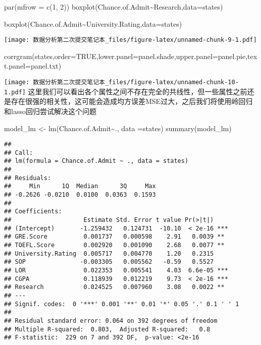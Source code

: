 \documentclass[
]{article}
\newenvironment{Shaded}{\begin{snugshade}}{\end{snugshade}}
\newcommand{\AttributeTok}[1]{\textcolor[rgb]{0.77,0.63,0.00}{#1}}
\newcommand{\ConstantTok}[1]{\textcolor[rgb]{0.00,0.00,0.00}{#1}}
\newcommand{\DecValTok}[1]{\textcolor[rgb]{0.00,0.00,0.81}{#1}}
\newcommand{\FunctionTok}[1]{\textcolor[rgb]{0.00,0.00,0.00}{#1}}
\newcommand{\NormalTok}[1]{#1}
\newcommand{\OtherTok}[1]{\textcolor[rgb]{0.56,0.35,0.01}{#1}}
\newcommand{\SpecialCharTok}[1]{\textcolor[rgb]{0.00,0.00,0.00}{#1}}
\begin{document}
\begin{Shaded}
\begin{Highlighting}[]
\FunctionTok{par}\NormalTok{(}\AttributeTok{mfrow =} \FunctionTok{c}\NormalTok{(}\DecValTok{1}\NormalTok{, }\DecValTok{2}\NormalTok{))}
\FunctionTok{boxplot}\NormalTok{(Chance.of.Admit}\SpecialCharTok{\textasciitilde{}}\NormalTok{Research,}\AttributeTok{data=}\NormalTok{states)}

\FunctionTok{boxplot}\NormalTok{(Chance.of.Admit}\SpecialCharTok{\textasciitilde{}}\NormalTok{University.Rating,}\AttributeTok{data=}\NormalTok{states)}
\end{Highlighting}
\end{Shaded}

\texttt{[image: 数据分析第二次提交笔记本\_files/figure-latex/unnamed-chunk-9-1.pdf]}

\begin{Shaded}
\begin{Highlighting}[]
\FunctionTok{corrgram}\NormalTok{(states,}\AttributeTok{order=}\ConstantTok{TRUE}\NormalTok{,}\AttributeTok{lower.panel=}\NormalTok{panel.shade,}\AttributeTok{upper.panel=}\NormalTok{panel.pie,}\AttributeTok{text.panel=}\NormalTok{panel.txt)}
\end{Highlighting}
\end{Shaded}

\texttt{[image: 数据分析第二次提交笔记本\_files/figure-latex/unnamed-chunk-10-1.pdf]}
这里我们可以看出各个属性之间不存在完全的共线性，但一些属性之前还是存在很强的相关性，这可能会造成均方误差MSE过大，之后我们将使用岭回归和lasso回归尝试解决这个问题

\begin{Shaded}
\begin{Highlighting}[]
\NormalTok{model\_lm }\OtherTok{\textless{}{-}} \FunctionTok{lm}\NormalTok{(Chance.of.Admit}\SpecialCharTok{\textasciitilde{}}\NormalTok{., }\AttributeTok{data =}\NormalTok{states)}
\FunctionTok{summary}\NormalTok{(model\_lm)}
\end{Highlighting}
\end{Shaded}

\begin{verbatim}
## 
## Call:
## lm(formula = Chance.of.Admit ~ ., data = states)
## 
## Residuals:
##     Min      1Q  Median      3Q     Max 
## -0.2626 -0.0210  0.0100  0.0363  0.1593 
## 
## Coefficients:
##                    Estimate Std. Error t value Pr(>|t|)    
## (Intercept)       -1.259432   0.124731  -10.10  < 2e-16 ***
## GRE.Score          0.001737   0.000598    2.91   0.0039 ** 
## TOEFL.Score        0.002920   0.001090    2.68   0.0077 ** 
## University.Rating  0.005717   0.004770    1.20   0.2315    
## SOP               -0.003305   0.005562   -0.59   0.5527    
## LOR                0.022353   0.005541    4.03  6.6e-05 ***
## CGPA               0.118939   0.012219    9.73  < 2e-16 ***
## Research           0.024525   0.007960    3.08   0.0022 ** 
## ---
## Signif. codes:  0 '***' 0.001 '**' 0.01 '*' 0.05 '.' 0.1 ' ' 1
## 
## Residual standard error: 0.064 on 392 degrees of freedom
## Multiple R-squared:  0.803,  Adjusted R-squared:   0.8 
## F-statistic:  229 on 7 and 392 DF,  p-value: <2e-16
\end{verbatim}
\end{document}
